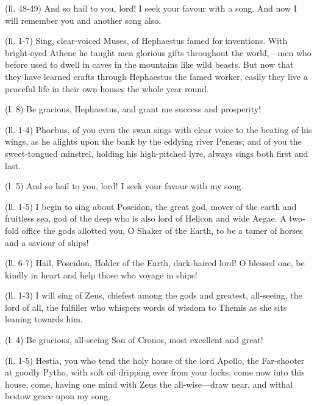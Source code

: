 (ll. 48-49) And so hail to you, lord! I seek your favour with a song. And now I
will remember you and another song also.


(ll. 1-7) Sing, clear-voiced Muses, of Hephaestus famed for inventions. With
bright-eyed Athene he taught men glorious gifts throughout the world,—men
who before used to dwell in caves in the mountains like wild beasts. But now
that they have learned crafts through Hephaestus the famed worker, easily they
live a peaceful life in their own houses the whole year round.

(l. 8) Be gracious, Hephaestus, and grant me success and prosperity!


(ll. 1-4) Phoebus, of you even the swan sings with clear voice to the beating
of his wings, as he alights upon the bank by the eddying river Peneus; and of
you the sweet-tongued minstrel, holding his high-pitched lyre, always sings
both first and last.

(l. 5) And so hail to you, lord! I seek your favour with my song.


(ll. 1-5) I begin to sing about Poseidon, the great god, mover of the earth and
fruitless sea, god of the deep who is also lord of Helicon and wide Aegae. A
two-fold office the gods allotted you, O Shaker of the Earth, to be a tamer of
horses and a saviour of ships!

(ll. 6-7) Hail, Poseidon, Holder of the Earth, dark-haired lord! O blessed one,
be kindly in heart and help those who voyage in ships!


(ll. 1-3) I will sing of Zeus, chiefest among the gods and greatest,
all-seeing, the lord of all, the fulfiller who whispers words of wisdom to
Themis as she sits leaning towards him.

(l. 4) Be gracious, all-seeing Son of Cronos, most excellent and great!


(ll. 1-5) Hestia, you who tend the holy house of the lord Apollo, the
Far-shooter at goodly Pytho, with soft oil dripping ever from your locks, come
now into this house, come, having one mind with Zeus the all-wise—draw
near, and withal bestow grace upon my song.


